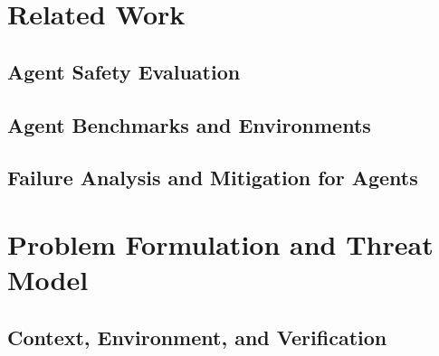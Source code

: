\documentclass[10pt]{article}
\begin{document}

\section{Related Work}
\subsection{Agent Safety Evaluation}
\subsection{Agent Benchmarks and Environments}
\subsection{Failure Analysis and Mitigation for Agents}

\section{Problem Formulation and Threat Model}
\subsection{Context, Environment, and Verification}
\end{document}
